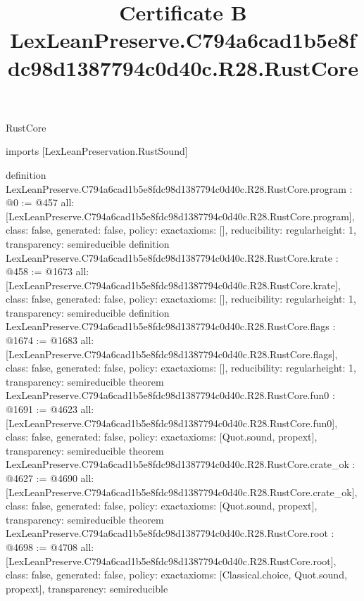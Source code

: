 \begin{lexlean}{RustCore}
\title{Certificate B LexLeanPreserve.C794a6cad1b5e8fdc98d1387794c0d40c.R28.RustCore}
\begin{coremodule}
imports [LexLeanPreservation.RustSound]

definition LexLeanPreserve.C794a6cad1b5e8fdc98d1387794c0d40c.R28.RustCore.program : @0 := @457 {
  all: [LexLeanPreserve.C794a6cad1b5e8fdc98d1387794c0d40c.R28.RustCore.program],
  class: false,
  generated: false,
  policy: exact{axioms: []},
  reducibility: regular{height: 1},
  transparency: semireducible
}
definition LexLeanPreserve.C794a6cad1b5e8fdc98d1387794c0d40c.R28.RustCore.krate : @458 := @1673 {
  all: [LexLeanPreserve.C794a6cad1b5e8fdc98d1387794c0d40c.R28.RustCore.krate],
  class: false,
  generated: false,
  policy: exact{axioms: []},
  reducibility: regular{height: 1},
  transparency: semireducible
}
definition LexLeanPreserve.C794a6cad1b5e8fdc98d1387794c0d40c.R28.RustCore.flags : @1674 := @1683 {
  all: [LexLeanPreserve.C794a6cad1b5e8fdc98d1387794c0d40c.R28.RustCore.flags],
  class: false,
  generated: false,
  policy: exact{axioms: []},
  reducibility: regular{height: 1},
  transparency: semireducible
}
theorem LexLeanPreserve.C794a6cad1b5e8fdc98d1387794c0d40c.R28.RustCore.fun0 : @1691 := @4623 {
  all: [LexLeanPreserve.C794a6cad1b5e8fdc98d1387794c0d40c.R28.RustCore.fun0],
  class: false,
  generated: false,
  policy: exact{axioms: [Quot.sound, propext]},
  transparency: semireducible
}
theorem LexLeanPreserve.C794a6cad1b5e8fdc98d1387794c0d40c.R28.RustCore.crate_ok : @4627 := @4690 {
  all: [LexLeanPreserve.C794a6cad1b5e8fdc98d1387794c0d40c.R28.RustCore.crate_ok],
  class: false,
  generated: false,
  policy: exact{axioms: [Quot.sound, propext]},
  transparency: semireducible
}
theorem LexLeanPreserve.C794a6cad1b5e8fdc98d1387794c0d40c.R28.RustCore.root : @4698 := @4708 {
  all: [LexLeanPreserve.C794a6cad1b5e8fdc98d1387794c0d40c.R28.RustCore.root],
  class: false,
  generated: false,
  policy: exact{axioms: [Classical.choice, Quot.sound, propext]},
  transparency: semireducible
}


\end{coremodule}
\end{lexlean}
